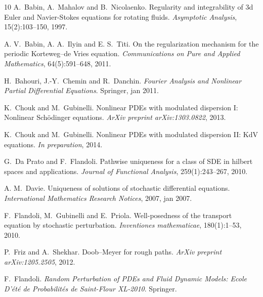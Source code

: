 \documentclass[a4paper,11pt]{article}
\newcommand{\tmtextit}[1]{{\itshape{#1}}}
\begin{document}
\begin{thebibliography}{10}
  A.~Babin, A.~Mahalov{{ and
  }}B.~Nicolaenko.{\newblock} Regularity and integrability of $3$d {E}uler and
  {N}avier-{S}tokes equations for rotating fluids.{\newblock} \tmtextit{Asymptotic
  Analysis}, 15(2):103--150, 1997.{\newblock}
  
  A. V.~Babin, A. A.~Ilyin{{ and }}E.
  S.~Titi.{\newblock} On the regularization mechanism for the periodic
  {K}orteweg--de {V}ries equation.{\newblock} \tmtextit{Communications on Pure and
  Applied Mathematics}, 64(5):591--648, 2011.{\newblock}
  
  H.~Bahouri, J.-Y.~Chemin{{
  and }}R.~Danchin.{\newblock} \tmtextit{Fourier Analysis and Nonlinear
  Partial Differential Equations}.{\newblock} Springer, jan 2011.{\newblock}
  
  K.~Chouk{{ and
  }}M.~Gubinelli.{\newblock} Nonlinear PDEs with modulated dispersion {I}:
  {N}onlinear {S}ch\"odinger equations.{\newblock} \tmtextit{ArXiv preprint
  arXiv:1303.0822}, 2013.{\newblock}
  
  K.~Chouk{{ and
  }}M.~Gubinelli.{\newblock} Nonlinear PDEs with modulated dispersion {II}: {KdV}
  equations.{\newblock} \tmtextit{In preparation}, 2014.{\newblock}
  
  G.~Da Prato{{ and }}F.~Flandoli.{\newblock} Pathwise
  uniqueness for a class of SDE in hilbert spaces and applications.{\newblock}
  \tmtextit{Journal of Functional Analysis}, 259(1):243--267, 2010.{\newblock}
  
  A. M.~Davie.{\newblock} Uniqueness of solutions of
  stochastic differential equations.{\newblock} \tmtextit{International
  Mathematics Research Notices}, 2007, jan 2007.{\newblock}
  
  F.~Flandoli, M.~Gubinelli{{ and
  }}E.~Priola.{\newblock} Well-posedness of the transport equation by
  stochastic perturbation.{\newblock} \tmtextit{Inventiones mathematicae},
  180(1):1--53, 2010.{\newblock}
  
  P.~Friz{{ and
  }}A.~Shekhar.{\newblock} Doob--Meyer for rough paths.{\newblock}
  \tmtextit{ArXiv preprint arXiv:1205.2505}, 2012.{\newblock}
  
  F.~Flandoli.{\newblock}
  \tmtextit{Random Perturbation of PDEs and Fluid Dynamic Models: Ecole
  D'\'et\'e de Probabilit\'es de Saint-Flour XL-2010}.{\newblock}
  Springer.{\newblock}
  

\end{thebibliography}
\end{document}
